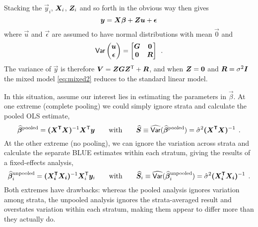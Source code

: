 Stacking the $\vec{y}_i$, $\bm{X}_i$, $\bm{Z}_i$ and so forth in the obvious way then gives
\begin{equation}\label{eq:mixed2}
 \bm{y} = \bm{X} \bm{\beta} + \bm{Z} \bm{u} + \bm{\epsilon}
\end{equation}
where $\vec{u}$ and $\vec{\epsilon}$ are assumed to have normal distributions with mean $\vec{0}$
and
\begin{equation}\label{eq:mixed3}
 \mathsf{Var}  
      \begin{pmatrix}
       \bm{u} \\ \bm{\epsilon}
      \end{pmatrix}
      =
      \begin{bmatrix}
      \bm{G} & \bm{0} \\ \bm{0} & \bm{R}
      \end{bmatrix} \:\: .
\end{equation}
The variance of $\vec{y}$ is therefore $\bm{V} = \bm{Z} \bm{G} \bm{Z}^\mathsf{T} + \bm{R}$, and when
$\bm{Z} = \bm{0}$ and $\bm{R} = \sigma^2 \bm{I}$ the mixed model \eqref{eq:mixed2} reduces to the
standard linear model.

In this situation, assume our interest lies in estimating the parameters in $\vec{\beta}$.  At one extreme
(complete pooling) we could simply ignore strata and calculate the pooled OLS estimate,
\begin{equation}\label{eq:mixed4}
 \widehat{\bm{\beta}}^{\textrm{pooled}} = \bm{(\bm{X}^\mathsf{T} \bm{X})}^{-1} \bm{X}^\mathsf{T} \bm{y}
 \quad\quad \textrm{with} \quad\quad
 \widehat{\bm{S}} \equiv \widehat{\mathsf{Var}}(\widehat{\bm{\beta}}^{\textrm{pooled}}) = \hat{\sigma}^2 \bm{(\bm{X}^\mathsf{T} \bm{X})}^{-1} \:\: .
\end{equation}
At the other extreme (no pooling), we can ignore the variation across strata and calculate the
separate BLUE estimates within each stratum, giving the results of a fixed-effects analysis,
\begin{equation}\label{eq:mixed5}
 \widehat{\bm{\beta}}^{\textrm{unpooled}}_i = \bm{(\bm{X}_i^\mathsf{T} \bm{X}_i)}^{-1} \bm{X}_i^\mathsf{T} \bm{y}_i
 \quad\quad \textrm{with} \quad\quad
 \widehat{\bm{S}}_i \equiv \widehat{\mathsf{Var}}(\widehat{\bm{\beta}}^{\textrm{unpooled}}_i) = \hat{\sigma}^2 \bm{(\bm{X}_i^\mathsf{T} \bm{X}_i)}^{-1} \:\: .
\end{equation}
Both extremes have drawbacks:  whereas the pooled analysis ignores variation among strata, the unpooled analysis ignores the
strata-averaged result and overstates variation within each stratum, making them appear to differ more than they actually do.

